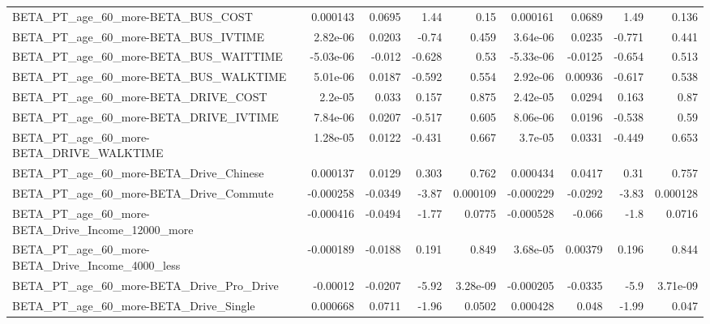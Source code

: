 \begin{tabular}{lrrrrrrrr}
BETA\_PT\_age\_60\_more-BETA\_BUS\_COST                  &    0.000143 &       0.0695 &      1.44 &     0.15 &   0.000161 &      0.0689 &         1.49 &         0.136 \\
BETA\_PT\_age\_60\_more-BETA\_BUS\_IVTIME                &    2.82e-06 &       0.0203 &     -0.74 &    0.459 &   3.64e-06 &      0.0235 &       -0.771 &         0.441 \\
BETA\_PT\_age\_60\_more-BETA\_BUS\_WAITTIME              &   -5.03e-06 &       -0.012 &    -0.628 &     0.53 &  -5.33e-06 &     -0.0125 &       -0.654 &         0.513 \\
BETA\_PT\_age\_60\_more-BETA\_BUS\_WALKTIME              &    5.01e-06 &       0.0187 &    -0.592 &    0.554 &   2.92e-06 &     0.00936 &       -0.617 &         0.538 \\
BETA\_PT\_age\_60\_more-BETA\_DRIVE\_COST                &     2.2e-05 &        0.033 &     0.157 &    0.875 &   2.42e-05 &      0.0294 &        0.163 &          0.87 \\
BETA\_PT\_age\_60\_more-BETA\_DRIVE\_IVTIME              &    7.84e-06 &       0.0207 &    -0.517 &    0.605 &   8.06e-06 &      0.0196 &       -0.538 &          0.59 \\
BETA\_PT\_age\_60\_more-BETA\_DRIVE\_WALKTIME            &    1.28e-05 &       0.0122 &    -0.431 &    0.667 &    3.7e-05 &      0.0331 &       -0.449 &         0.653 \\
BETA\_PT\_age\_60\_more-BETA\_Drive\_Chinese             &    0.000137 &       0.0129 &     0.303 &    0.762 &   0.000434 &      0.0417 &         0.31 &         0.757 \\
BETA\_PT\_age\_60\_more-BETA\_Drive\_Commute             &   -0.000258 &      -0.0349 &     -3.87 & 0.000109 &  -0.000229 &     -0.0292 &        -3.83 &      0.000128 \\
BETA\_PT\_age\_60\_more-BETA\_Drive\_Income\_12000\_more   &   -0.000416 &      -0.0494 &     -1.77 &   0.0775 &  -0.000528 &      -0.066 &         -1.8 &        0.0716 \\
BETA\_PT\_age\_60\_more-BETA\_Drive\_Income\_4000\_less    &   -0.000189 &      -0.0188 &     0.191 &    0.849 &   3.68e-05 &     0.00379 &        0.196 &         0.844 \\
BETA\_PT\_age\_60\_more-BETA\_Drive\_Pro\_Drive           &    -0.00012 &      -0.0207 &     -5.92 & 3.28e-09 &  -0.000205 &     -0.0335 &         -5.9 &      3.71e-09 \\
BETA\_PT\_age\_60\_more-BETA\_Drive\_Single              &    0.000668 &       0.0711 &     -1.96 &   0.0502 &   0.000428 &       0.048 &        -1.99 &         0.047 \\

\end{tabular}
